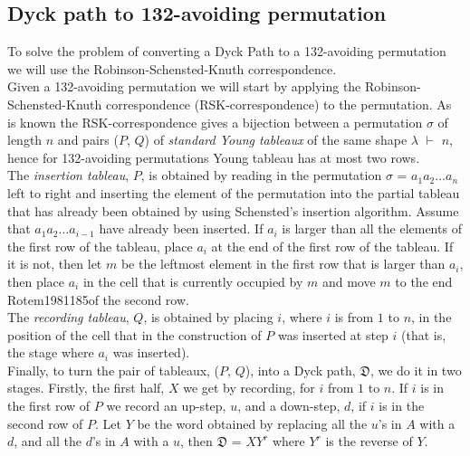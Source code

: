 \documentclass[12pt]{article}
\newcommand{\DyckP}{\mathfrak{D}}
\begin{document}
\subsection{Dyck path to 132-avoiding permutation}
\label{sec:backwardsStandard}
To solve the problem of converting a Dyck Path to a 132-avoiding permutation we will use the Robinson-Schensted-Knuth correspondence.\\
Given a 132-avoiding permutation we will start by applying the Robinson-Schensted-Knuth correspondence (RSK-correspondence) to the permutation. As is known the RSK-correspondence gives a bijection between a permutation $\sigma$ of length $n$ and pairs ($P$, $Q$) of {\it standard Young tableaux} of the same shape $\lambda$  $\vdash$ $n$, hence for 132-avoiding permutations Young tableau has at most two rows.\\
The {\it insertion tableau}, $P$, is obtained by reading in the permutation $\sigma$ = $a_{1}a_{2}...a_{n}$ left to right and inserting the element of the permutation into the partial tableau that has already been obtained by using Schensted's insertion algorithm. Assume that $a_{1}a_{2}...a_{i-1}$ have already been inserted. If $a_{i}$ is larger than all the elements of the first row of the tableau, place $a_{i}$ at the end of the first row of the tableau. If it is not, then let $m$ be the leftmost element in the first row that is larger than $a_{i}$, then place $a_{i}$ in the cell that is currently occupied by $m$ and move $m$ to the end Rotem1981185of the second row.\\
The {\it recording tableau}, $Q$, is obtained by placing $i$, where $i$ is from $1$ to $n$, in the position of the cell that in the construction of $P$ was inserted at step $i$ (that is, the stage where $a_{i}$ was inserted).\\
Finally, to turn the pair of tableaux, ($P$, $Q$), into a Dyck path, $\DyckP$, we do it in two stages. Firstly, the first half, $X$ we get by recording, for $i$ from $1$ to $n$. If $i$ is in the first row of $P$ we record an up-step, $u$, and a down-step, $d$, if $i$ is in the second row of $P$. Let $Y$ be the word obtained by replacing all the $u$'s in $A$ with a $d$, and all the $d$'s in $A$ with a $u$, then $\DyckP$ = $XY^r$ where $Y^r$ is the reverse of $Y$.
\end{document}
